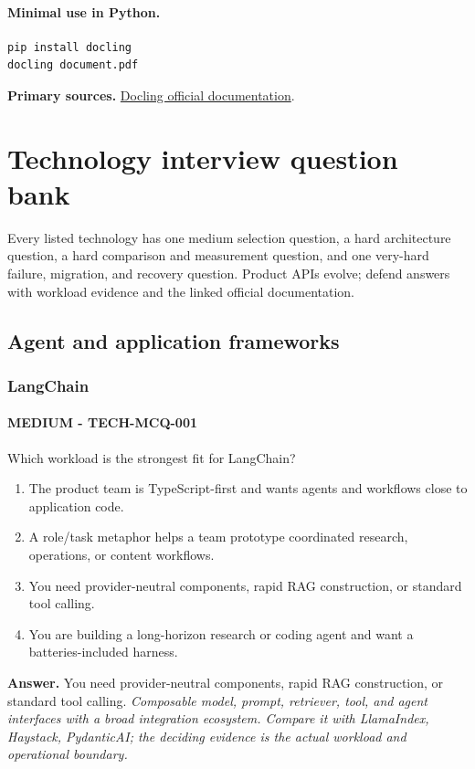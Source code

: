 \paragraph{Minimal use in Python.}
\begin{Verbatim}[fontsize=\scriptsize]
pip install docling
docling document.pdf
\end{Verbatim}
\textbf{Primary sources.} \href{https://docling-project.github.io/docling/}{Docling official documentation}.
\clearpage\section{Technology interview question bank}
Every listed technology has one medium selection question, a hard architecture question, a hard comparison and measurement question, and one very-hard failure, migration, and recovery question. Product APIs evolve; defend answers with workload evidence and the linked official documentation.
\subsection{Agent and application frameworks}
\subsubsection*{LangChain}
\paragraph{MEDIUM - TECH-MCQ-001} Which workload is the strongest fit for LangChain?
\begin{enumerate}[label=\Alph*.]
\item The product team is TypeScript-first and wants agents and workflows close to application code.
\item A role/task metaphor helps a team prototype coordinated research, operations, or content workflows.
\item You need provider-neutral components, rapid RAG construction, or standard tool calling.
\item You are building a long-horizon research or coding agent and want a batteries-included harness.
\end{enumerate}
\textbf{Answer.} You need provider-neutral components, rapid RAG construction, or standard tool calling.
\textit{Composable model, prompt, retriever, tool, and agent interfaces with a broad integration ecosystem. Compare it with LlamaIndex, Haystack, PydanticAI; the deciding evidence is the actual workload and operational boundary.}
